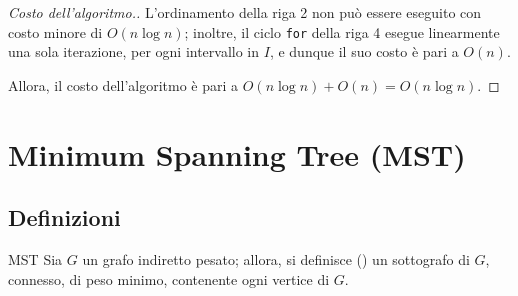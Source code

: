 \documentclass[a4paper, 12pt]{report}
\begin{document}
    \begin{proof}[Costo dell'algoritmo.]
        L'ordinamento della riga 2 non può essere eseguito con costo minore di $O(n \log n)$; inoltre, il ciclo \texttt{for} della riga 4 esegue linearmente una sola iterazione, per ogni intervallo in $I$, e dunque il suo costo è pari a $O(n)$.

        Allora, il costo dell'algoritmo è pari a $O(n \log n) + O(n) = O(n \log n)$.
    \end{proof}

    \section{Minimum Spanning Tree (MST)}

    \subsection{Definizioni}

    \begin{frameddefn}{MST}
        Sia $G$ un grafo indiretto pesato; allora, si definisce  () un sottografo di $G$, connesso, di peso minimo, contenente ogni vertice di $G$.
    \end{frameddefn}
\end{document}
